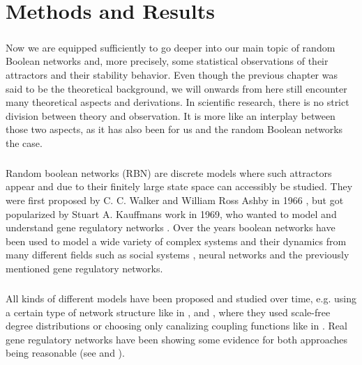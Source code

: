 \chapter{Methods and Results}\thispagestyle{fancy}
\paragraph*{}
Now we are equipped sufficiently to go deeper into our main topic of random Boolean networks and, more precisely, some statistical observations of their attractors and their stability behavior. Even though the previous chapter was said to be the theoretical background, we will onwards from here still encounter many theoretical aspects and derivations. In scientific research, there is no strict division between theory and observation. It is more like an interplay between those two aspects, as it has also been for us and the random Boolean networks the case.


\paragraph*{}
Random boolean networks (RBN) are discrete models where such attractors appear and due to their finitely large state space can accessibly be studied. They were first proposed by C. C. Walker and William Ross Ashby in 1966 \cite{walker1966temporal}, but got popularized by Stuart A. Kauffmans work in 1969, who wanted to model and understand gene regulatory networks \cite{kauffman1969homeostasis}. Over the years boolean networks have been used to model a wide variety of complex systems and their dynamics from many different fields such as social systems \cite{moreira2004efficient}, neural networks \cite{rosen2001multilayer} and the previously mentioned gene regulatory networks.

\paragraph*{}
All kinds of different models have been proposed and studied over time, e.g. using a certain type of network structure like in \cite{aldana2003boolean2}, \cite{iguchi2007boolean} and \cite{serra2004dynamics}, where they used scale-free degree distributions or choosing only canalizing coupling functions like in \cite{moreira2005canalizing}. Real gene regulatory networks have been showing some evidence for both approaches being reasonable (see \cite{moreira2005canalizing} and \cite{shaw2003evidence}).

